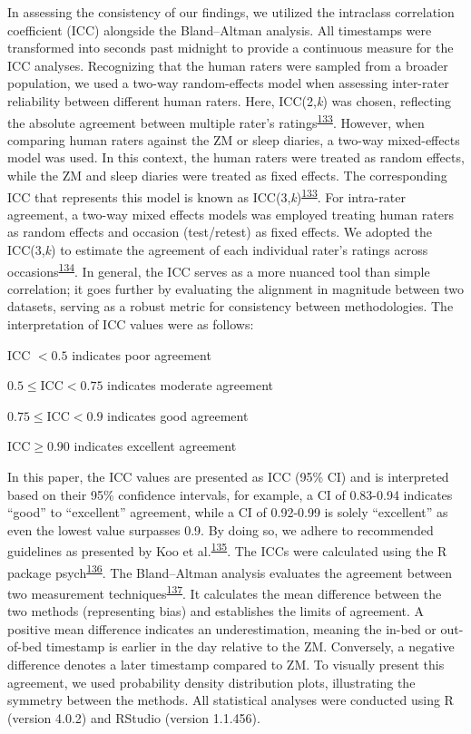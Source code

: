 \documentclass[
  10pt,
]{scrbook}
\begin{document}
In assessing the consistency of our findings, we utilized the intraclass
correlation coefficient (ICC) alongside the Bland--Altman analysis. All
timestamps were transformed into seconds past midnight to provide a
continuous measure for the ICC analyses. Recognizing that the human
raters were sampled from a broader population, we used a two-way
random-effects model when assessing inter-rater reliability between
different human raters. Here, ICC(2,\emph{k}) was chosen, reflecting the
absolute agreement between multiple rater's
ratings\textsuperscript{\protect\hyperlink{ref-shrout_1979}{133}}.
However, when comparing human raters against the ZM or sleep diaries, a
two-way mixed-effects model was used. In this context, the human raters
were treated as random effects, while the ZM and sleep diaries were
treated as fixed effects. The corresponding ICC that represents this
model is known as
ICC(3,\emph{k})\textsuperscript{\protect\hyperlink{ref-shrout_1979}{133}}.
For intra-rater agreement, a two-way mixed effects models was employed
treating human raters as random effects and occasion (test/retest) as
fixed effects. We adopted the ICC(3,\emph{k}) to estimate the agreement
of each individual rater's ratings across
occasions\textsuperscript{\protect\hyperlink{ref-mcgraw_1996}{134}}. In
general, the ICC serves as a more nuanced tool than simple correlation;
it goes further by evaluating the alignment in magnitude between two
datasets, serving as a robust metric for consistency between
methodologies. The interpretation of ICC values were as follows:

\begin{center}
ICC \(< 0.5\) indicates poor agreement

\(0.5 \leq \text{ICC} < 0.75\) indicates moderate agreement

\(0.75 \leq \text{ICC} < 0.9\) indicates good agreement

\(\text{ICC} \geq 0.90\) indicates excellent agreement
\end{center}

In this paper, the ICC values are presented as ICC (95\% CI) and is
interpreted based on their 95\% confidence intervals, for example, a CI
of 0.83-0.94 indicates ``good'' to ``excellent'' agreement, while a CI
of 0.92-0.99 is solely ``excellent'' as even the lowest value surpasses
0.9. By doing so, we adhere to recommended guidelines as presented by
Koo et
al.\textsuperscript{\protect\hyperlink{ref-koo_guideline_2016}{135}}.
The ICCs were calculated using the R package
psych\textsuperscript{\protect\hyperlink{ref-psych}{136}}. The
Bland--Altman analysis evaluates the agreement between two measurement
techniques\textsuperscript{\protect\hyperlink{ref-bland_measuring_1999}{137}}.
It calculates the mean difference between the two methods (representing
bias) and establishes the limits of agreement. A positive mean
difference indicates an underestimation, meaning the in-bed or
out-of-bed timestamp is earlier in the day relative to the ZM.
Conversely, a negative difference denotes a later timestamp compared to
ZM. To visually present this agreement, we used probability density
distribution plots, illustrating the symmetry between the methods. All
statistical analyses were conducted using R (version 4.0.2) and RStudio
(version 1.1.456).
\end{document}
